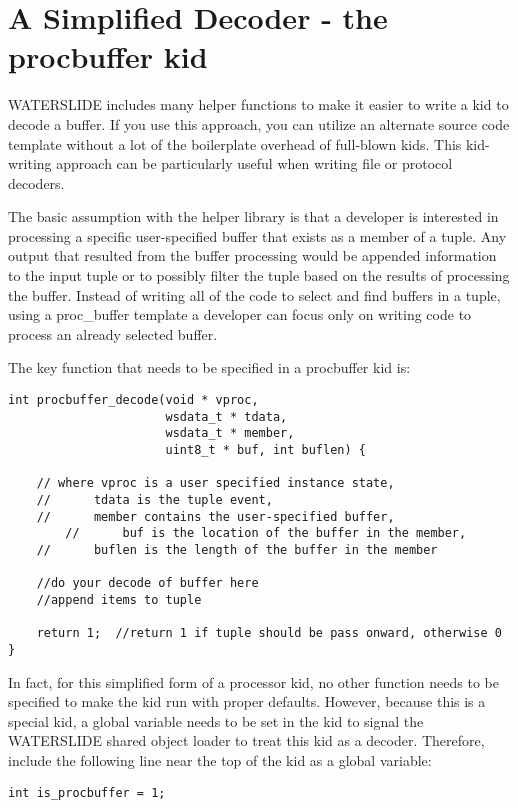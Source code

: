 \documentclass[11pt]{article}
\begin{document}
\section {A Simplified Decoder - the procbuffer kid}\label{sec:procbuffer}
WATERSLIDE includes many helper functions to make it easier to write a kid to 
decode a buffer. If you use this approach, you can utilize an alternate source 
code template without a lot of the boilerplate overhead of full-blown kids. 
This kid-writing approach can be particularly useful when writing file or
protocol decoders.  

The basic assumption with the helper library is that a developer is interested 
in processing a specific user-specified buffer that exists as a member of a 
tuple.  Any output that resulted from the buffer processing would be appended 
information to the input tuple or to possibly filter the tuple based on the
results of processing the buffer. Instead of writing all of the code to select 
and find buffers in a tuple, using a proc\_buffer template a developer can
focus only on writing code to process an already selected buffer.

The key function that needs to be specified in a procbuffer kid is:
\begin{lstlisting}
int procbuffer_decode(void * vproc,
                      wsdata_t * tdata,
                      wsdata_t * member,
                      uint8_t * buf, int buflen) {	

	// where vproc is a user specified instance state,
	//      tdata is the tuple event,
	//      member contains the user-specified buffer,
        //      buf is the location of the buffer in the member,
	//      buflen is the length of the buffer in the member

	//do your decode of buffer here
	//append items to tuple

	return 1;  //return 1 if tuple should be pass onward, otherwise 0
}
\end{lstlisting}

In fact, for this simplified form of a processor kid, no other function needs 
to be  specified to make the kid run with proper defaults.  However, because
this is a special kid, a global variable needs to be set in the kid to signal 
the WATERSLIDE shared  object loader to treat this kid as a decoder.  Therefore, 
include the following line near the top of the kid as a global variable:

\begin{lstlisting}
int is_procbuffer = 1;
\end{lstlisting}
\end{document}

